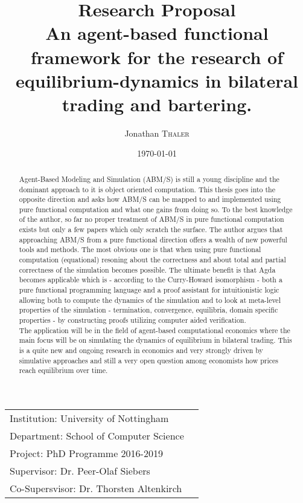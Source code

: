 \documentclass{article}
\title{Research Proposal \\ An agent-based functional framework for the research of equilibrium-dynamics in bilateral trading and bartering.} %
\author{Jonathan \textsc{Thaler}} %
\date{\today} %
\begin{document}
\maketitle %

\begin{center}
\begin{tabular}{l r}
Institution: University of Nottingham \\
Department: School of Computer Science \\
Project: PhD Programme 2016-2019 \\
Supervisor: Dr. Peer-Olaf Siebers \\
Co-Supersvisor: Dr. Thorsten Altenkirch 
\end{tabular}
\end{center}

\begin{abstract}
Agent-Based Modeling and Simulation (ABM/S) is still a young discipline and the dominant approach to it is object oriented computation. This thesis goes into the opposite direction and asks how ABM/S can be mapped to and implemented using pure functional computation and what one gains from doing so. To the best knowledge of the author, so far no proper treatment of ABM/S in pure functional computation exists but only a few papers which only scratch the surface. The author argues that approaching ABM/S from a pure functional direction  offers a wealth of new powerful tools and methods. The most obvious one is that when using pure functional computation (equational) resoning about the correctness and about total and partial correctness of the simulation becomes possible. The ultimate benefit is that Agda becomes applicable which is - according to the Curry-Howard isomorphism - both a pure functional programming language and a proof assistant for intuitionistic logic allowing both to compute the dynamics of the simulation and to look at meta-level properties of the simulation - termination, convergence, equilibria, domain specific properties - by constructing proofs utilizing computer aided verification. \\
The application will be in the field of agent-based computational economics where the main focus will be on simulating the dynamics of equilibrium in bilateral trading. This is a quite new and ongoing research in economics and very strongly driven by simulative approaches and still a very open question among economists how prices reach equilibrium over time.

\end{abstract}
\end{document}
